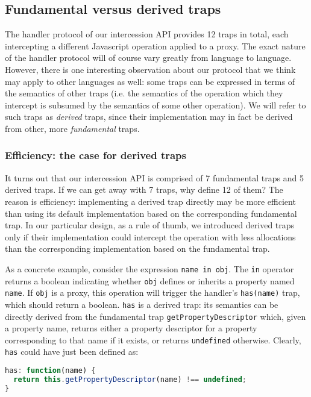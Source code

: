 \documentclass{acm_proc_article-sp}
\begin{document}
\subsection{Fundamental versus derived traps}
\label{sub:fundamental_vs_derived_traps}

The handler protocol of our intercession API provides 12 traps in total, each intercepting a different Javascript operation applied to a proxy. The exact nature of the handler protocol will of course vary greatly from language to language. However, there is one interesting observation about our protocol that we think may apply to other languages as well: some traps can be expressed in terms of the semantics of other traps (i.e. the semantics of the operation which they intercept is subsumed by the semantics of some other operation). We will refer to such traps as \emph{derived} traps, since their implementation may in fact be derived from other, more \emph{fundamental} traps.

\subsubsection{Efficiency: the case for derived traps}

It turns out that our intercession API is comprised of 7 fundamental traps and 5 derived traps. If we can get away with 7 traps, why define 12 of them? The reason is efficiency: implementing a derived trap directly may be more efficient than using its default implementation based on the corresponding fundamental trap. In our particular design, as a rule of thumb, we introduced derived traps only if their implementation could intercept the operation with less allocations than the corresponding implementation based on the fundamental trap.

As a concrete example, consider the expression \texttt{name in obj}. The \texttt{in} operator returns a boolean indicating whether \texttt{obj} defines or inherits a property named \texttt{name}. If \texttt{obj} is a proxy, this operation will trigger the handler's \texttt{has(name)} trap, which should return a boolean. \texttt{has} is a derived trap: its semantics can be directly derived from the fundamental trap \texttt{getPropertyDescriptor} which, given a property name, returns either a property descriptor for a property corresponding to that name if it exists, or returns \texttt{undefined} otherwise. Clearly, \texttt{has} could have just been defined as:

\begin{lstlisting}[language=javascript]
has: function(name) {
  return this.getPropertyDescriptor(name) !== undefined;
}
\end{lstlisting}
\end{document}
